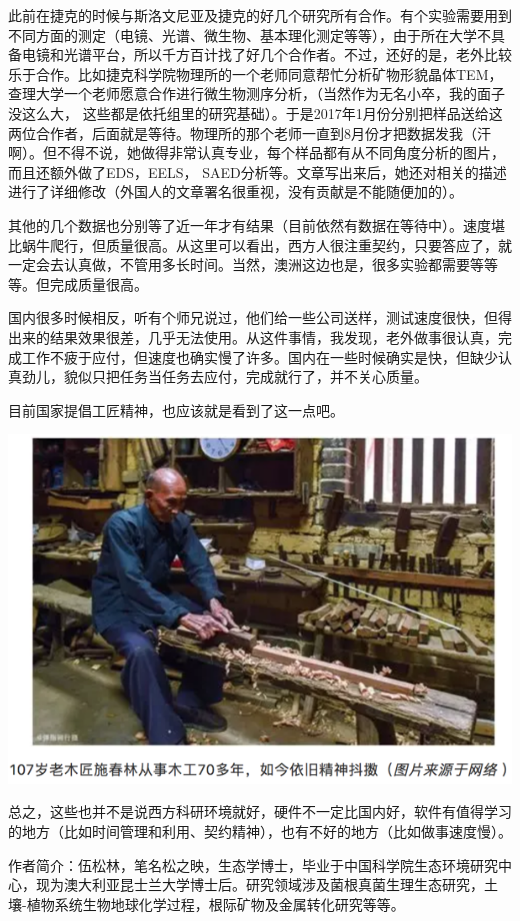 \documentclass[]{book}
\begin{document}
此前在捷克的时候与斯洛文尼亚及捷克的好几个研究所有合作。有个实验需要用到不同方面的测定（电镜、光谱、微生物、基本理化测定等等），由于所在大学不具备电镜和光谱平台，所以千方百计找了好几个合作者。不过，还好的是，老外比较乐于合作。比如捷克科学院物理所的一个老师同意帮忙分析矿物形貌晶体TEM，查理大学一个老师愿意合作进行微生物测序分析，（当然作为无名小卒，我的面子没这么大，
这些都是依托组里的研究基础）。于是2017年1月份分别把样品送给这两位合作者，后面就是等待。物理所的那个老师一直到8月份才把数据发我（汗啊）。但不得不说，她做得非常认真专业，每个样品都有从不同角度分析的图片，而且还额外做了EDS，EELS，
SAED分析等。文章写出来后，她还对相关的描述进行了详细修改（外国人的文章署名很重视，没有贡献是不能随便加的）。

其他的几个数据也分别等了近一年才有结果（目前依然有数据在等待中）。速度堪比蜗牛爬行，但质量很高。从这里可以看出，西方人很注重契约，只要答应了，就一定会去认真做，不管用多长时间。当然，澳洲这边也是，很多实验都需要等等等。但完成质量很高。

国内很多时候相反，听有个师兄说过，他们给一些公司送样，测试速度很快，但得出来的结果效果很差，几乎无法使用。从这件事情，我发现，老外做事很认真，完成工作不疲于应付，但速度也确实慢了许多。国内在一些时候确实是快，但缺少认真劲儿，貌似只把任务当任务去应付，完成就行了，并不关心质量。

目前国家提倡工匠精神，也应该就是看到了这一点吧。

\includegraphics[width=8.33in]{images/osre5}

总之，这些也并不是说西方科研环境就好，硬件不一定比国内好，软件有值得学习的地方（比如时间管理和利用、契约精神），也有不好的地方（比如做事速度慢）。

作者简介：伍松林，笔名松之映，生态学博士，毕业于中国科学院生态环境研究中心，现为澳大利亚昆士兰大学博士后。研究领域涉及菌根真菌生理生态研究，土壤-植物系统生物地球化学过程，根际矿物及金属转化研究等等。
\end{document}
